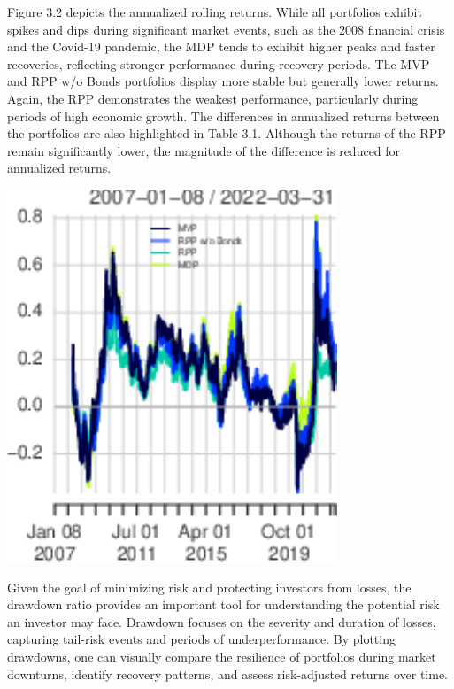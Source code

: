 \documentclass[11pt,preprint]{elsarticle}
\let\origfigure\figure
\let\endorigfigure\endfigure
\renewenvironment{figure}[1][2] {
    \expandafter\origfigure\expandafter[H]
} {
    \endorigfigure
}
\numberwithin{equation}{section}
\numberwithin{figure}{section}
\numberwithin{table}{section}
\begin{document}
Figure 3.2 depicts the annualized rolling returns. While all portfolios
exhibit spikes and dips during significant market events, such as the
2008 financial crisis and the Covid-19 pandemic, the MDP tends to
exhibit higher peaks and faster recoveries, reflecting stronger
performance during recovery periods. The MVP and RPP w/o Bonds
portfolios display more stable but generally lower returns. Again, the
RPP demonstrates the weakest performance, particularly during periods of
high economic growth. The differences in annualized returns between the
portfolios are also highlighted in Table 3.1. Although the returns of
the RPP remain significantly lower, the magnitude of the difference is
reduced for annualized returns.

\begin{figure}[H]

{\centering \includegraphics{Essay_files/figure-latex/Figure2-1} 

}

\caption{Annualized rolling returns \label{Figure2}}\label{fig:Figure2}
\end{figure}

Given the goal of minimizing risk and protecting investors from losses,
the drawdown ratio provides an important tool for understanding the
potential risk an investor may face. Drawdown focuses on the severity
and duration of losses, capturing tail-risk events and periods of
underperformance. By plotting drawdowns, one can visually compare the
resilience of portfolios during market downturns, identify recovery
patterns, and assess risk-adjusted returns over time.
\end{document}
